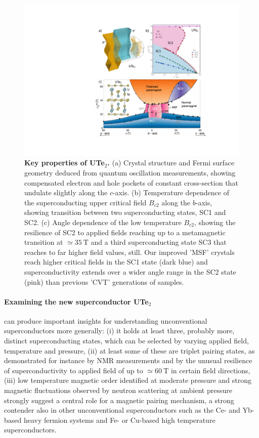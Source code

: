 \begin{figure}
  \includegraphics[width=\columnwidth]{Figures/UTe2Overview.pdf}
  \caption{{\bf Key properties of UTe$_2$.} (a) Crystal structure and Fermi surface geometry deduced from quantum oscillation measurements, showing compensated electron and hole pockets of constant cross-section that undulate slightly along the $c$-axis. (b) Temperature dependence of the superconducting upper critical field $B_{c2}$ along the $b$-axis, showing transition between two superconducting states, SC1 and SC2. (c) Angle dependence of the low temperature $B_{c2}$, showing the resilience of SC2 to applied fields reaching up to a metamagnetic transition at $\simeq \SI{35}{\tesla}$ and a third superconducting state SC3 that reaches to far higher field values, still. Our improved 'MSF' crystals reach higher critical fields in the SC1 state (dark blue) and superconductivity extends over a wider angle range in the SC2 state (pink) than previous 'CVT' generations of samples.}
  \label{fig:UTe2}
\end{figure}

\paragraph{Examining the new superconductor UTe$_2$} can produce important insights for understanding unconventional superconductors more generally: (i) it holds at least three, probably more, distinct superconducting states, which can be selected by varying applied field, temperature and pressure, (ii) at least some of these are triplet pairing states, as demonstrated for instance by NMR measurements and by the unusual resilience of superconductivity to applied field of up to $\simeq \SI{60}{\tesla}$ in certain field directions, (iii) low temperature magnetic order identified at moderate pressure and strong magnetic fluctuations observed by neutron scattering at ambient pressure strongly suggest a central role for a magnetic pairing mechanism, a strong contender also in other unconventional superconductors such as the Ce- and Yb-based heavy fermion systems and Fe- or Cu-based high temperature superconductors.

